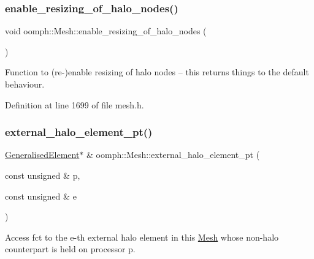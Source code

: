 \mbox{\label{classoomph_1_1Mesh_a0bd38a0cb5e303f75b9f2b4c746acc13}} 
\subsubsection{\texorpdfstring{enable\+\_\+resizing\+\_\+of\+\_\+halo\+\_\+nodes()}{enable\_resizing\_of\_halo\_nodes()}}
{\footnotesize\ttfamily void oomph\+::\+Mesh\+::enable\+\_\+resizing\+\_\+of\+\_\+halo\+\_\+nodes (\begin{DoxyParamCaption}{ }\end{DoxyParamCaption})\hspace{0.3cm}{\ttfamily [inline]}}



Function to (re-\/)enable resizing of halo nodes -- this returns things to the default behaviour. 



Definition at line 1699 of file mesh.\+h.

\mbox{\label{classoomph_1_1Mesh_aa4f7d6d4baaf855aeab9bfe5687f9ab9}} 
\subsubsection{\texorpdfstring{external\+\_\+halo\+\_\+element\+\_\+pt()}{external\_halo\_element\_pt()}}
{\footnotesize\ttfamily \hyperlink{classoomph_1_1GeneralisedElement}{Generalised\+Element}$\ast$ \& oomph\+::\+Mesh\+::external\+\_\+halo\+\_\+element\+\_\+pt (\begin{DoxyParamCaption}\item[{const unsigned \&}]{p,  }\item[{const unsigned \&}]{e }\end{DoxyParamCaption})\hspace{0.3cm}{\ttfamily [inline]}}



Access fct to the e-\/th external halo element in this \hyperlink{classoomph_1_1Mesh}{Mesh} whose non-\/halo counterpart is held on processor p. 



